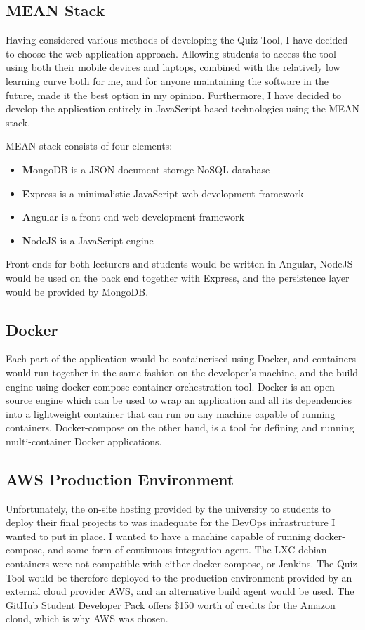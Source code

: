 \subsection{MEAN Stack}
Having considered various methods of developing the Quiz Tool, I have decided to
choose the web application approach. Allowing students to access the tool using both
their mobile devices and laptops, combined with the relatively low learning curve
both for me, and for anyone maintaining the software in the future, made it the best
option in my opinion. Furthermore, I have decided to develop the application entirely
in JavaScript based technologies using the MEAN stack\cite{18}.

MEAN stack consists of four elements:
\begin{itemize}
  \item \textbf{M}ongoDB is a JSON document storage NoSQL database
  \item \textbf{E}xpress is a minimalistic JavaScript web development framework
  \item \textbf{A}ngular is a front end web development framework
  \item \textbf{N}odeJS is a JavaScript engine
\end{itemize}

Front ends for both lecturers and students would be written in Angular, NodeJS would be
used on the back end together with Express, and the persistence layer would be provided
by MongoDB.

\subsection{Docker}
Each part of the application would be containerised using Docker\cite{19}, and containers
would run together in the same fashion on the developer's machine, and the build engine
using docker-compose\cite{20} container orchestration tool. Docker is an open source
engine which can be used to wrap an application and all its dependencies into a
lightweight container that can run on any machine capable of running containers\cite{21}.
Docker-compose on the other hand, is a tool for defining and running multi-container
Docker applications.

\subsection{AWS Production Environment}
Unfortunately, the on-site hosting provided by the university to students to deploy
their final projects to was inadequate for the DevOps infrastructure I wanted to
put in place. I wanted to have a machine capable of running docker-compose, and some
form of continuous integration agent. The LXC debian containers\cite{22} were not
compatible with either docker-compose, or Jenkins\cite{23}. The Quiz Tool would be therefore
deployed to the production environment provided by an external cloud provider AWS\cite{24},
and an alternative build agent would be used. The GitHub Student Developer Pack\cite{25} offers
\$150 worth of credits for the Amazon cloud, which is why AWS was chosen.

